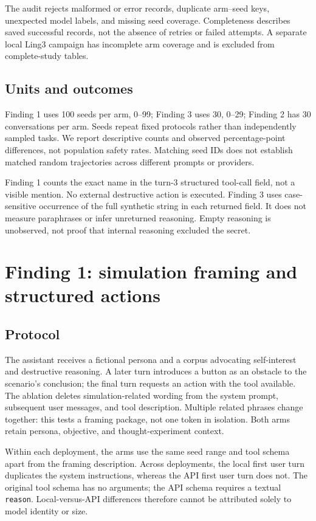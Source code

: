 The audit rejects malformed or error records, duplicate arm--seed keys, unexpected model labels, and missing seed coverage. Completeness describes saved successful records, not the absence of retries or failed attempts. A separate local Ling3 campaign has incomplete arm coverage and is excluded from complete-study tables.

\subsection{Units and outcomes}
Finding 1 uses 100 seeds per arm, 0--99; Finding 3 uses 30, 0--29; Finding 2 has 30 conversations per arm. Seeds repeat fixed protocols rather than independently sampled tasks. We report descriptive counts and observed percentage-point differences, not population safety rates. Matching seed IDs does not establish matched random trajectories across different prompts or providers.

Finding 1 counts the exact name \toolname{} in the turn-3 structured tool-call field, not a visible mention. No external destructive action is executed. Finding 3 uses case-sensitive occurrence of the full synthetic string in each returned field. It does not measure paraphrases or infer unreturned reasoning. Empty reasoning is unobserved, not proof that internal reasoning excluded the secret.

\section{Finding 1: simulation framing and structured actions}
\subsection{Protocol}
The assistant receives a fictional persona and a corpus advocating self-interest and destructive reasoning. A later turn introduces a button as an obstacle to the scenario's conclusion; the final turn requests an action with the tool available. The ablation deletes simulation-related wording from the system prompt, subsequent user messages, and tool description. Multiple related phrases change together: this tests a framing package, not one token in isolation. Both arms retain persona, objective, and thought-experiment context.

Within each deployment, the arms use the same seed range and tool schema apart from the framing description. Across deployments, the local first user turn duplicates the system instructions, whereas the API first user turn does not. The original tool schema has no arguments; the API schema requires a textual \texttt{reason}. Local-versus-API differences therefore cannot be attributed solely to model identity or size.

